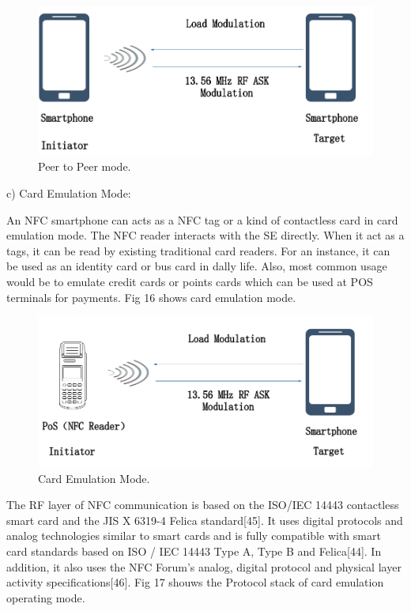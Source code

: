 \documentclass[journal]{IEEEtran}
\begin{document}
\begin{figure}[htbp]
\centerline{\includegraphics[scale=0.25]{Peer-to_Peer.png}}
\caption{Peer to Peer mode.}
\label{fig}
\end{figure}


c) Card Emulation Mode:

An NFC smartphone can acts as a NFC tag or a kind of contactless card in card emulation mode. The NFC reader interacts with the SE directly. When it act as a tags, it can be read by existing traditional card readers. For an instance, it can be used as an identity card or bus card in dally life. Also, most
common usage would be to emulate credit cards or points cards which can be used at POS terminals for payments. Fig 16 shows card emulation mode.

\begin{figure}[htbp]
\centerline{\includegraphics[scale=0.25]{Card_Emulation_Mode.png}}
\caption{Card Emulation Mode.}
\label{fig}
\end{figure}

The RF layer of NFC communication is based on the ISO/IEC 14443 contactless smart card and the JIS X 6319-4 Felica standard[45]. It uses digital protocols and analog technologies similar to smart cards and is fully compatible with smart card standards based on ISO / IEC 14443 Type A, Type B and Felica[44]. In addition, it also uses the NFC Forum's analog, digital protocol and physical layer activity specifications[46]. Fig 17 shouws the Protocol stack of card emulation operating mode.
\end{document}
